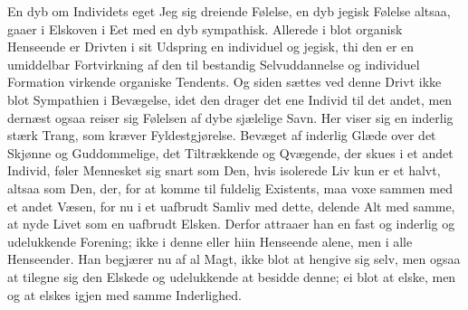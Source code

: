 \documentclass[12pt,a4paper]{book}
\newcommand{\apage}[1]{\marginnote{\footnotesize\textit{[#1]}}}
\begin{document}
En dyb om Individets eget Jeg sig dreiende Følelse, en dyb jegisk
Følelse altsaa, gaaer i Elskoven i Eet med en dyb sympathisk. Allerede
i blot organisk Henseende er Drivten i sit Udspring en individuel og
jegisk, thi den er en umiddelbar Fortvirkning af den til bestandig
Selvuddannelse og individuel Formation virkende organiske Tendents. Og
siden sættes ved denne Drivt ikke blot Sympathien i Bevægelse, idet den
drager det ene Individ til det andet, men dernæst ogsaa reiser sig
Følelsen af dybe sjælelige Savn. Her viser sig en inderlig stærk Trang,
som kræver Fyldestgjørelse. Bevæget af inderlig Glæde over det Skjønne
og Guddommelige, det Tiltrækkende og Qvægende, der skues i et andet
Individ, føler Mennesket sig snart som Den, hvis isolerede Liv kun er et
halvt, altsaa som Den, der, for at komme til fuldelig Existents, maa
voxe sammen med et andet Væsen, for nu i et uafbrudt Samliv med dette,
delende Alt med samme, at nyde \apage{30} Livet som en uafbrudt Elsken. Derfor
attraaer han en fast og inderlig og udelukkende Forening; ikke i denne
eller hiin Henseende alene, men i alle Henseender. Han begjærer nu af
al Magt, ikke blot at hengive sig selv, men ogsaa at tilegne sig den
Elskede og udelukkende at besidde denne; ei blot at elske, men og at
elskes igjen med samme Inderlighed.
\end{document}
